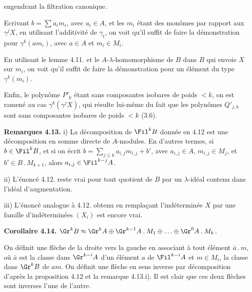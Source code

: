 
engendrant la filtration canonique.

Ecrivant \(b=\sum a_i m_i\), avec \(a_i\in A\), et les \(m_i\) étant des monômes par rapport aux \(\gamma^j X\), en utilisant l'additivité de \(\gamma_t\), on voit qu'il suffit de faire la démonstration pour \(\gamma^k(am_i)\), avec \(a\in A\) et \(m_i\in M_i\).

En utilisant le lemme 4.11. et le \(A\)-\(\lambda\)-homomorphisme de \(B\) dans \(B\) qui envoie \(X\) sur \(m_i\), on voit qu'il suffit de faire la démonstration pour un élément du type \(\gamma^k(m_i)\).

Enfin, le polynôme \(P'_k\) étant sans composantes isobares de poids \(<k\), on est ramené au cas \(\gamma^k(\gamma^j X)\), qui résulte lui-même du fait que les polynômes \(Q'_{j,k}\) sont sans composantes isobares de poids \(<k\) (3.6).

\textbf{Remarques 4.13.} i) La décomposition de \(\Fil^k B\) donnée en 4.12 est une décomposition en somme directe de \(A\)-modules. En d'autres termes, si \(b\in\Fil^k B\), et si on écrit \(b=\sum_{j\le k}a_{i,j}m_{i,j}+b'\), avec \(a_{i,j}\in A\), \(m_{i,j}\in M_j\), et \(b'\in B\mathbin{.}M_{k+1}\), alors \(a_{i,j}\in\Fil^{k-j}A\).

ii) L'énoncé 4.12. reste vrai pour tout quotient de \(B\) par un \(\lambda\)-idéal contenu dans l'idéal d'augmentation.

iii) L'énoncé analogue à 4.12. obtenu en remplaçant l'indéterminée \(X\) par une famille d'indéterminées \((X_i)\) est encore vrai.

\textbf{Corollaire 4.14.} \(\Gr^k B\approx\Gr^k A\oplus\Gr^{k-1}A\mathbin{.}M_1\oplus\ldots\oplus\Gr^0 A\mathbin{.}M_k\).

On définit une flèche de la droite vers la gauche en associant à tout élément \(\bar a\mathbin{.}m\), où \(\bar a\) est la classe dans \(\Gr^{k-i}A\) d'un élément \(a\) de \(\Fil^{k-i}A\) et \(m\in M_i\), la classe dans \(\Gr^k B\) de \(am\). On définit une flèche en sens inverse par décomposition d'après la proposition 4.12 et la remarque 4.13.i). Il est clair que ces deux flèches sont inverses l'une de l'autre.

